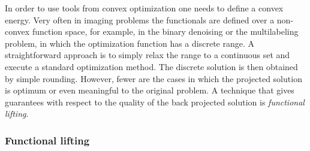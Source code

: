 In order to use tools from convex optimization one needs to define a convex energy. Very often in imaging problems the functionals are defined over a non-convex function space, for example, in the binary denoising or the multilabeling problem, in which the optimization function has a discrete range. A straightforward approach is to simply relax the range to a continuous set and execute a standard optimization method. The discrete solution is then obtained by simple rounding. However, fewer are the cases in which the projected solution is optimum or even meaningful to the original problem. A technique that gives guarantees with respect to the quality of the back projected solution is \emph{functional lifting}.

\subsubsection{Functional lifting}

